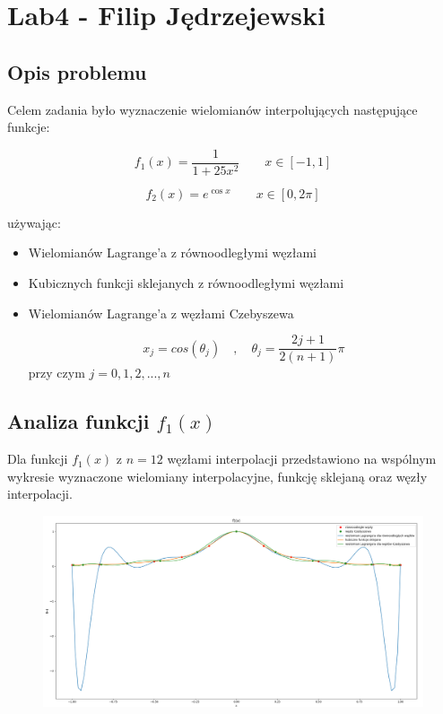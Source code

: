 \documentclass{article}
\begin{document}
	\section*{Lab4 - Filip Jędrzejewski}
	
	\subsection*{Opis problemu}
	
	Celem zadania było wyznaczenie wielomianów interpolujących następujące funkcje:
	
	\begin{equation}
		f_1(x) = \frac{1}{1+25x^2} \quad  \quad x \in [-1,1]
	\end{equation}
	
	\begin{equation}
		f_2(x) = e^{\cos x} \quad  \quad x \in [0,2 \pi]
	\end{equation}
	
	używając: 
	
	\begin{itemize}
		\item Wielomianów Lagrange'a z równoodległymi węzłami
		\item Kubicznych funkcji sklejanych z równoodległymi węzłami
		\item Wielomianów Lagrange'a z węzłami Czebyszewa
		
		\begin{equation}
			x_j = cos(\theta_j) \quad , \quad \theta_j = \frac{2j+1}{2(n+1)}\pi
		\end{equation}
		przy czym $j = 0, 1, 2, ..., n$ 
			
	\end{itemize}
	
	\subsection*{Analiza funkcji $f_1(x)$}
	
	Dla funkcji $f_1(x)$ z $n=12$ węzłami interpolacji przedstawiono na wspólnym wykresie wyznaczone wielomiany interpolacyjne, funkcję sklejaną oraz węzły interpolacji.
	
	\begin{figure}[h]
    		\centering
  		\includegraphics[scale = 0.3]{wykres1.png}
	\end{figure}
	
\end{document}
